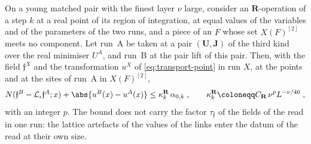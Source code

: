 \begin{proposition}\label{prop:read-runs}
On a young matched pair with the finest layer $\nu$ large, consider an $\mathbf R$-operation of a step $k$ at a real point of its region of integration, at equal values of the variables and of the parameters of the two runs, and a piece of an $F$ whose set $X(F)^{[2]}$ meets no component. Let run~A be taken at a pair $(\mathbf U, \mathbf J)$ of the third kind over the real minimiser $U^A$, and run~B at the pair lift of this pair. Then, with the field $\mathfrak f^X$ and the transformation $u^X$ of \eqref{eq:transport-point} in run $X$, at the points and at the sites of run~A in $X(F)^{[2]}$,
\[
    N(\mathfrak f^B - \mathcal L_\iota\mathfrak f^A; x) + \abs{u^B(x) - u^A(x)} \leq \kappa^{\mathbf R}_k\,\alpha_{0,k}\;,
    \qquad
    \kappa^{\mathbf R}_k \coloneqq C_{\mathbf R}\,\nu^{p}L^{-\nu/40}\;,
\]
with an integer $p$. The bound does not carry the factor $\tau_{\mathfrak f}$ of the fields of the read in one run: the lattice artefacts of the values of the links enter the datum of the read at their own size.
\end{proposition}

